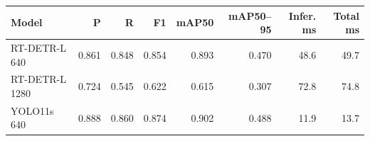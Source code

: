 \begin{tabular}{lrrrrrrr}
\hline
Model & P & R & F1 & mAP50 & mAP50--95 & Infer. ms & Total ms \\
\hline
RT-DETR-L 640 & 0.861 & 0.848 & 0.854 & 0.893 & 0.470 & 48.6 & 49.7 \\
RT-DETR-L 1280 & 0.724 & 0.545 & 0.622 & 0.615 & 0.307 & 72.8 & 74.8 \\
YOLO11s 640 & 0.888 & 0.860 & 0.874 & 0.902 & 0.488 & 11.9 & 13.7 \\
\hline
\end{tabular}
